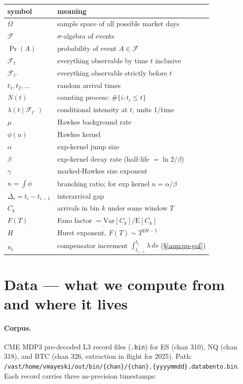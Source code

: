 \begin{center}
\begin{tabular}{@{}ll@{}}
\toprule
symbol & meaning \\
\midrule
$\Omega$ & sample space of all possible market days \\
$\mathcal{F}$ & $\sigma$-algebra of events \\
$\Pr(A)$ & probability of event $A \in \mathcal{F}$ \\
$\mathcal{F}_t$ & everything observable by time $t$ inclusive \\
$\mathcal{F}_{t^-}$ & everything observable strictly before $t$ \\
$t_1, t_2, \ldots$ & random arrival times \\
$N(t)$ & counting process: $\#\{i : t_i \leq t\}$ \\
$\lambda(t \mid \mathcal{F}_{t^-})$ & conditional intensity at $t$, units 1/time \\
$\mu$ & Hawkes background rate \\
$\phi(u)$ & Hawkes kernel \\
$\alpha$ & exp-kernel jump size \\
$\beta$ & exp-kernel decay rate (half-life $= \ln 2 / \beta$) \\
$\gamma$ & marked-Hawkes size exponent \\
$n = \int \phi$ & branching ratio; for exp kernel $n = \alpha/\beta$ \\
$\Delta_i = t_i - t_{i-1}$ & interarrival gap \\
$C_k$ & arrivals in bin $k$ under some window $T$ \\
$F(T)$ & Fano factor $= \mathrm{Var}[C_k] / \mathrm{E}[C_k]$ \\
$H$ & Hurst exponent, $F(T) \sim T^{2H-1}$ \\
$u_i$ & compensator increment $\int_{t_{i-1}}^{t_i} \lambda\, ds$ (\S\ref{app:pp-gof}) \\
\bottomrule
\end{tabular}
\end{center}

\section{Data --- what we compute from and where it lives}
\label{app:data}

\paragraph{Corpus.} CME MDP3 pre-decoded L3 record files (\texttt{.bin}) for ES (chan 310), NQ (chan 318), and BTC (chan 326, extraction in flight for 2025). Path: \texttt{/vast/home/vmayeski/out/bin/\{chan\}/\{chan\}.\{yyyymmdd\}.databento.bin}. Each record carries three ns-precision timestamps:

